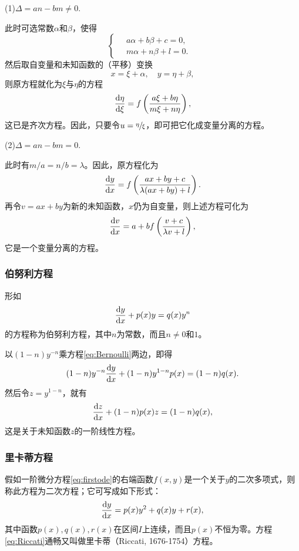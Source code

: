 (1)\quad $\Delta=an-bm\neq 0.$

此时可选常数$\alpha$和$\beta$，使得
\[
\begin{cases}
\quad a\alpha+b\beta+c=0, &\\
\quad m\alpha+n\beta+l=0.
\end{cases}
\]
然后取自变量和未知函数的（平移）变换
\[
x=\xi+\alpha,\quad y=\eta+\beta,
\]
则原方程就化为$\xi$与$\eta$的方程
\[
\frac{\mathrm{d}{}\eta}{\mathrm{d}{}\xi}=f\left(\frac{a\xi+b\eta}{m\xi+n\eta}\right),
\]
这已是齐次方程。因此，只要令$u=\sfrac{\eta}{\xi}$，即可把它化成变量分离的方程。

(2)\quad $\Delta=an-bm=0.$

此时有$m/a=n/b=\lambda$。因此，原方程化为
\[
\frac{\mathrm{d}{}y}{\mathrm{d}{}x}=f\left(\frac{ax+by+c}{\lambda(ax+by)+l}\right).
\]
再令$v=ax+by$为新的未知函数，$x$仍为自变量，则上述方程可化为
\[
\frac{\mathrm{d}{}v}{\mathrm{d}{}x}=a+bf\left(\frac{v+c}{\lambda v+l}\right),
\]
它是一个变量分离的方程。

\subsubsection{伯努利方程}
\begin{defn}\label{def:eq:Bernoulli}
形如
\begin{equation}\label{eq:Bernoulli}
\frac{\mathrm{d}{}y}{\mathrm{d}{}x}+p(x)y=q(x)y^n
\end{equation}
的方程称为伯努利方程，其中$n$为常数，而且$n\neq 0$和$1$。
\end{defn}

以$(1-n)y^{-n}$乘方程\eqref{eq:Bernoulli}两边，即得
\[
(1-n)y^{-n}\frac{\mathrm{d}{}y}{\mathrm{d}{}x}+(1-n)y^{1-n}p(x)=(1-n)q(x).
\]
然后令$z=y^{1-n}$，就有
\[
\frac{\mathrm{d}{}z}{\mathrm{d}{}x}+(1-n)p(x)z=(1-n)q(x),
\]
这是关于未知函数$z$的一阶线性方程。

\subsubsection{里卡蒂方程}
\begin{defn}\label{def:eq:Riccati}
假如一阶微分方程\eqref{eq:firstode}的右端函数$f(x,y)$是一个关于$y$的二次多项式，则称此方程为二次方程；它可写成如下形式：
\begin{equation}\label{eq:Riccati}
\frac{\mathrm{d}{}y}{\mathrm{d}{}x}=p(x)y^2+q(x)y+r(x),
\end{equation}
其中函数$p(x),q(x),r(x)$在区间$I$上连续，而且$p(x)$不恒为零。方程\eqref{eq:Riccati}通畅又叫做里卡蒂（Riccati, 1676-1754）方程。
\end{defn}

